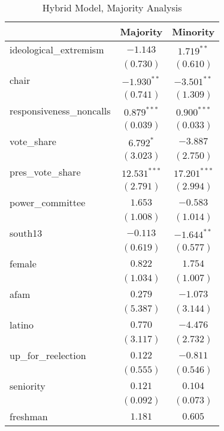 \documentclass[12pt]{article}
\begin{document}
\begin{table}
	\begin{center}
		\caption{Hybrid Model, Majority Analysis}
		\begin{tabular}{l c c }
			\hline
			& Majority & Minority \\
			\hline
			ideological\_extremism   & $-1.143$       & $1.719^{**}$   \\
			& $(0.730)$      & $(0.610)$      \\
			chair                    & $-1.930^{**}$  & $-3.501^{**}$  \\
			& $(0.741)$      & $(1.309)$      \\
			responsiveness\_noncalls & $0.879^{***}$  & $0.900^{***}$  \\
			& $(0.039)$      & $(0.033)$      \\
			vote\_share              & $6.792^{*}$    & $-3.887$       \\
			& $(3.023)$      & $(2.750)$      \\
			pres\_vote\_share        & $12.531^{***}$ & $17.201^{***}$ \\
			& $(2.791)$      & $(2.994)$      \\
			power\_committee         & $1.653$        & $-0.583$       \\
			& $(1.008)$      & $(1.014)$      \\
			south13                  & $-0.113$       & $-1.644^{**}$  \\
			& $(0.619)$      & $(0.577)$      \\
			female                   & $0.822$        & $1.754$        \\
			& $(1.034)$      & $(1.007)$      \\
			afam                     & $0.279$        & $-1.073$       \\
			& $(5.387)$      & $(3.144)$      \\
			latino                   & $0.770$        & $-4.476$       \\
			& $(3.117)$      & $(2.732)$      \\
			up\_for\_reelection      & $0.122$        & $-0.811$       \\
			& $(0.555)$      & $(0.546)$      \\
			seniority                & $0.121$        & $0.104$        \\
			& $(0.092)$      & $(0.073)$      \\
			freshman                 & $1.181$        & $0.605$        \\

\end{tabular}
\end{center}
\end{table}
\end{document}
